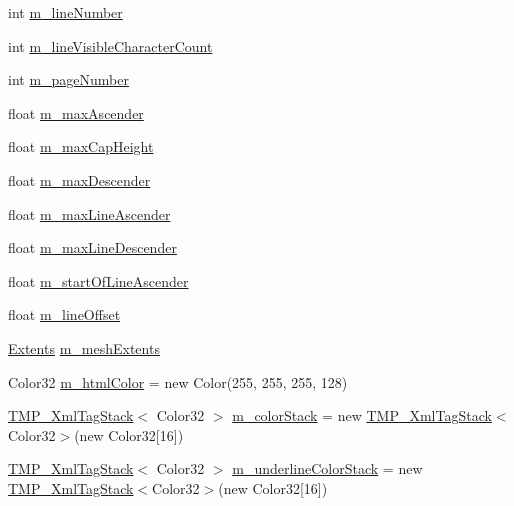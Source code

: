 \begin{DoxyCompactItemize}
\item 
int \mbox{\hyperlink{class_t_m_pro_1_1_t_m_p___text_a2dcc8f5189de1abcbc948e8f576e8801}{m\+\_\+line\+Number}}
\item 
int \mbox{\hyperlink{class_t_m_pro_1_1_t_m_p___text_ad6b9eea1bc014e4ed27564e29928aca1}{m\+\_\+line\+Visible\+Character\+Count}}
\item 
int \mbox{\hyperlink{class_t_m_pro_1_1_t_m_p___text_abd1940b5b9777227ab3f569e3a2bd0d6}{m\+\_\+page\+Number}}
\item 
float \mbox{\hyperlink{class_t_m_pro_1_1_t_m_p___text_a1a356b1017d6613bf92b086c065da01f}{m\+\_\+max\+Ascender}}
\item 
float \mbox{\hyperlink{class_t_m_pro_1_1_t_m_p___text_a9a49a3e65b14c38608dada88dd1eeb76}{m\+\_\+max\+Cap\+Height}}
\item 
float \mbox{\hyperlink{class_t_m_pro_1_1_t_m_p___text_a2ac2c5586bc29a703c0be026f2744473}{m\+\_\+max\+Descender}}
\item 
float \mbox{\hyperlink{class_t_m_pro_1_1_t_m_p___text_ac2731e05f6a8eb3e74c1cf3ae15d7f2e}{m\+\_\+max\+Line\+Ascender}}
\item 
float \mbox{\hyperlink{class_t_m_pro_1_1_t_m_p___text_a73016a6d4c468816ceb44a2aeae5551c}{m\+\_\+max\+Line\+Descender}}
\item 
float \mbox{\hyperlink{class_t_m_pro_1_1_t_m_p___text_a580dcc9ae67faf10f2cae2f076152de4}{m\+\_\+start\+Of\+Line\+Ascender}}
\item 
float \mbox{\hyperlink{class_t_m_pro_1_1_t_m_p___text_a8ce4c02f6f2c691858339f90f918f070}{m\+\_\+line\+Offset}}
\item 
\mbox{\hyperlink{struct_t_m_pro_1_1_extents}{Extents}} \mbox{\hyperlink{class_t_m_pro_1_1_t_m_p___text_aa94f6c365dcd8495eb63bae3306afbee}{m\+\_\+mesh\+Extents}}
\item 
Color32 \mbox{\hyperlink{class_t_m_pro_1_1_t_m_p___text_ad64b08c5fe4aecc521406b9b55ab1544}{m\+\_\+html\+Color}} = new Color(255, 255, 255, 128)
\item 
\mbox{\hyperlink{struct_t_m_pro_1_1_t_m_p___xml_tag_stack}{T\+M\+P\+\_\+\+Xml\+Tag\+Stack}}$<$ Color32 $>$ \mbox{\hyperlink{class_t_m_pro_1_1_t_m_p___text_a5c58927bf5cf1522a0dbe2444d6c04c5}{m\+\_\+color\+Stack}} = new \mbox{\hyperlink{struct_t_m_pro_1_1_t_m_p___xml_tag_stack}{T\+M\+P\+\_\+\+Xml\+Tag\+Stack}}$<$Color32$>$(new Color32\mbox{[}16\mbox{]})
\item 
\mbox{\hyperlink{struct_t_m_pro_1_1_t_m_p___xml_tag_stack}{T\+M\+P\+\_\+\+Xml\+Tag\+Stack}}$<$ Color32 $>$ \mbox{\hyperlink{class_t_m_pro_1_1_t_m_p___text_a8ded33472d3ad51b4390d03bdc505a09}{m\+\_\+underline\+Color\+Stack}} = new \mbox{\hyperlink{struct_t_m_pro_1_1_t_m_p___xml_tag_stack}{T\+M\+P\+\_\+\+Xml\+Tag\+Stack}}$<$Color32$>$(new Color32\mbox{[}16\mbox{]})

\end{DoxyCompactItemize}
